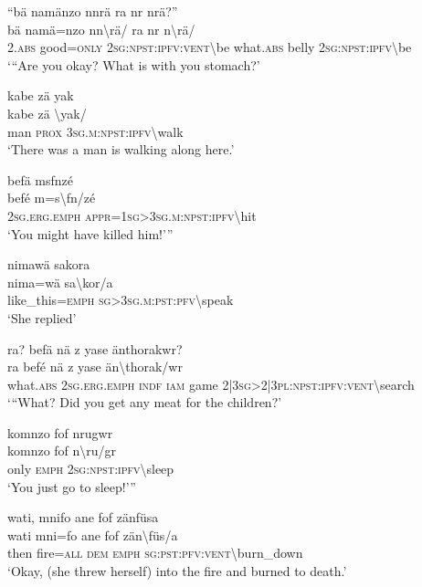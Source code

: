 \ea\label{ex:8:a1852}
``bä namänzo nnrä ra nr nrä?''\\
\gll bä	namä=nzo	nn{\textbackslash}rä/	ra	nr	n{\textbackslash}rä/\\
     2.\textsc{abs}	good=\textsc{only}	2\textsc{sg}:\textsc{npst}:\textsc{ipfv}:\textsc{vent}{\textbackslash}be	what.\textsc{abs}	belly	2\textsc{sg}:\textsc{npst}:\textsc{ipfv}{\textbackslash}be\\
\glt `{``}Are you okay? What is with you stomach?'
\z

\ea\label{ex:8:a1853}
kabe zä yak\\
\gll kabe	zä	{\textbackslash}yak/\\
     man	\textsc{prox}	3\textsc{sg}.\textsc{m}:\textsc{npst}:\textsc{ipfv}{\textbackslash}walk\\
\glt `There was a man is walking along here.'
\z

\ea\label{ex:8:a1854}
befä msfnzé\\
\gll befé	m=s{\textbackslash}fn/zé\\
     2\textsc{sg}.\textsc{erg}.\textsc{emph}	\textsc{appr}=1\textsc{sg}>3\textsc{sg}.\textsc{m}:\textsc{npst}:\textsc{ipfv}{\textbackslash}hit\\
\glt `You might have killed him!'''
\z

\ea\label{ex:8:a1855}
nimawä sakora\\
\gll nima=wä	sa{\textbackslash}kor/a\\
     like\_this=\textsc{emph}	\textsc{sg}>3\textsc{sg}.\textsc{m}:\textsc{pst}:\textsc{pfv}{\textbackslash}speak\\
\glt `She replied'
\z

\ea\label{ex:8:a1856}
ra? befä nä z yase änthorakwr?\\
\gll ra	befé	nä	z	yase	än{\textbackslash}thorak/wr\\
     what.\textsc{abs}	2\textsc{sg}.\textsc{erg}.\textsc{emph}	\textsc{indf}	\textsc{iam}	game	2|3\textsc{sg}>2|3\textsc{pl}:\textsc{npst}:\textsc{ipfv}:\textsc{vent}{\textbackslash}search\\
\glt `{``}What? Did you get any meat for the children?'
\z

\ea\label{ex:8:a1858}
komnzo fof nrugwr\\
\gll komnzo	fof	n{\textbackslash}ru/gr\\
     only	\textsc{emph}	2\textsc{sg}:\textsc{npst}:\textsc{ipfv}{\textbackslash}sleep\\
\glt `You just go to sleep!'''
\z

\ea\label{ex:8:a1859}
wati, mnifo ane fof zänfüsa\\
\gll wati	mni=fo	ane	fof	zän{\textbackslash}füs/a\\
     then	fire=\textsc{all}	\textsc{dem}	\textsc{emph}	\textsc{sg}:\textsc{pst}:\textsc{pfv}:\textsc{vent}{\textbackslash}burn\_down\\
\glt `Okay, (she threw herself) into the fire and burned to death.'
\z

